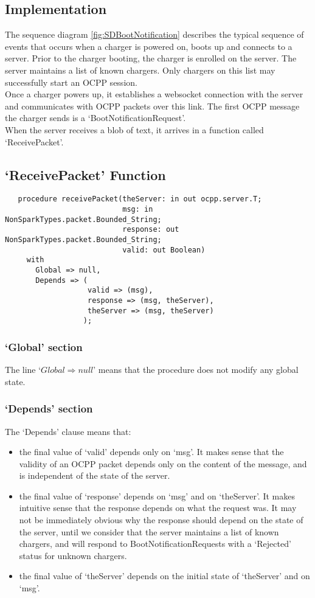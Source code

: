 \documentclass[12pt,openany,a4paper]{book}
\begin{document}
\subsection{Implementation}
The sequence diagram \ref{fig:SDBootNotification} describes the typical sequence of events that occurs when a charger is powered on, boots up and connects to a server. Prior to the charger booting, the charger is enrolled on the server. The server maintains a list of known chargers. Only chargers on this list may successfully start an OCPP session.\\
Once a charger powers up, it establishes a websocket connection with the server and communicates with OCPP packets over this link. The first OCPP message the charger sends is a `BootNotificationRequest'.\\
When the server receives a blob of text, it arrives in a function called `ReceivePacket'.

\subsection{`ReceivePacket' Function}

\begin{verbatim}
   procedure receivePacket(theServer: in out ocpp.server.T;
                           msg: in NonSparkTypes.packet.Bounded_String;
                           response: out NonSparkTypes.packet.Bounded_String;
                           valid: out Boolean)
     with
       Global => null,
       Depends => (
                   valid => (msg),
                   response => (msg, theServer),
                   theServer => (msg, theServer)
                  );
\end{verbatim}

\subsubsection{`Global' section}
The line `$Global \Rightarrow null$' means that the procedure does not modify any global state.
\subsubsection{`Depends' section}
The `Depends' clause means that:
\begin{itemize}
\item the final value of `valid' depends only on `msg'. It makes sense that the validity of an OCPP packet depends only on the content of the message, and is independent of the state of the server.
\item the final value of `response' depends on `msg' and on `theServer'. It makes intuitive sense that the response depends on what the request was. It may not be immediately obvious why the response should depend on the state of the server, until we consider that the server maintains a list of known chargers, and will respond to BootNotificationRequests with a `Rejected' status for unknown chargers.
\item the final value of `theServer' depends on the initial state of `theServer' and on `msg'. 
\end{itemize}
\end{document}
